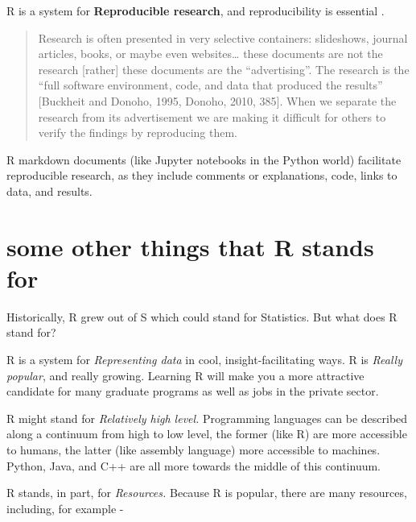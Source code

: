 \documentclass[
  openany]{book}
\begin{document}
R is a system for \textbf{Reproducible research}, and reproducibility is essential \citep{gandrud2016reproducible}.

\begin{quote}
Research is often presented in very selective containers: slideshows, journal articles, books, or maybe even websites\ldots{} these documents are not the research {[}rather{]} these documents are the ``advertising''. The research is the ``full software environment, code, and data that produced the results'' {[}Buckheit and Donoho, 1995, Donoho, 2010, 385{]}. When we separate the research from its advertisement we are making it difficult for others to verify the findings by reproducing them.
\end{quote}

R markdown documents (like Jupyter notebooks in the Python world) facilitate reproducible research, as they include comments or explanations, code, links to data, and results.

\hypertarget{some-other-things-that-r-stands-for}{%
\section{some other things that R stands for}\label{some-other-things-that-r-stands-for}}

Historically, R grew out of S which could stand for Statistics. But what does R stand for?

R is a system for \emph{Representing data} in cool, insight-facilitating ways. R is \emph{Really popular}, and really growing. Learning R will make you a more attractive candidate for many graduate programs as well as jobs in the private sector.

R might stand for \emph{Relatively high level.} Programming languages can be described along a continuum from high to low level, the former (like R) are more accessible to humans, the latter (like assembly language) more accessible to machines. Python, Java, and C++ are all more towards the middle of this continuum.

R stands, in part, for \emph{Resources.} Because R is popular, there are many resources, including, for example -
\end{document}
